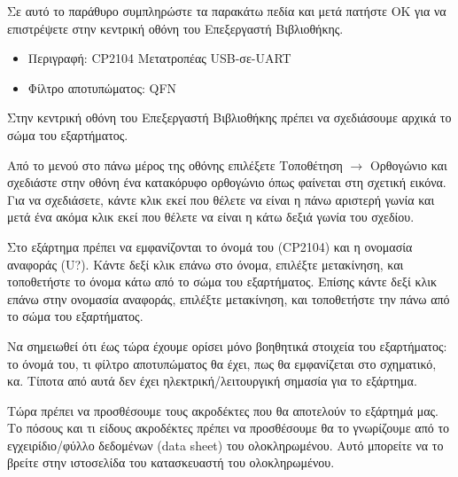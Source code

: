 \documentclass[a4paper]{article}
\begin{document}
\begin{figure}
  \begin{center}
    \label{fig:kicad-main}
  \end{center}
\end{figure}

Σε αυτό το παράθυρο συμπληρώστε τα παρακάτω πεδία και μετά πατήστε ΟΚ για να επιστρέψετε στην κεντρική οθόνη του Επεξεργαστή Βιβλιοθήκης.

\begin{itemize}
    \item Περιγραφή: \textenglish{CP2104} Μετατροπέας USB-σε-UART
    \item Φίλτρο αποτυπώματος: QFN
\end{itemize}

Στην κεντρική οθόνη του Επεξεργαστή Βιβλιοθήκης πρέπει να σχεδιάσουμε αρχικά το σώμα του εξαρτήματος. 

Από το μενού στο πάνω μέρος της οθόνης επιλέξετε Τοποθέτηση $\rightarrow$ Ορθογώνιο και σχεδιάστε στην οθόνη ένα κατακόρυφο ορθογώνιο όπως φαίνεται στη σχετική εικόνα. Για να σχεδιάσετε, κάντε κλικ εκεί που θέλετε να είναι η πάνω αριστερή γωνία και μετά ένα ακόμα κλικ εκεί που θέλετε να είναι η κάτω δεξιά γωνία του σχεδίου.

Στο εξάρτημα πρέπει να εμφανίζονται το όνομά του (\textenglish{CP2104}) και η ονομασία αναφοράς (U?). Κάντε δεξί κλικ επάνω στο όνομα, επιλέξτε μετακίνηση, και τοποθετήστε το όνομα κάτω από το σώμα του εξαρτήματος. Επίσης κάντε δεξί κλικ επάνω στην ονομασία αναφοράς, επιλέξτε μετακίνηση, και τοποθετήστε την πάνω από το σώμα του εξαρτήματος. 

\begin{figure}
  \begin{center}
    \label{fig:kicad-main}
  \end{center}
\end{figure}

Να σημειωθεί ότι έως τώρα έχουμε ορίσει μόνο βοηθητικά στοιχεία του εξαρτήματος: το όνομά του, τι φίλτρο αποτυπώματος θα έχει, πως θα εμφανίζεται στο σχηματικό, κα. Τίποτα από αυτά δεν έχει ηλεκτρική/λειτουργική σημασία για το εξάρτημα.

Τώρα πρέπει να προσθέσουμε τους ακροδέκτες που θα αποτελούν το εξάρτημά μας. Το πόσους και τι είδους ακροδέκτες πρέπει να προσθέσουμε θα το γνωρίζουμε από το εγχειρίδιο/φύλλο δεδομένων (data sheet) του ολοκληρωμένου. Αυτό μπορείτε να το βρείτε στην ιστοσελίδα του κατασκευαστή του ολοκληρωμένου. 
\end{document}
